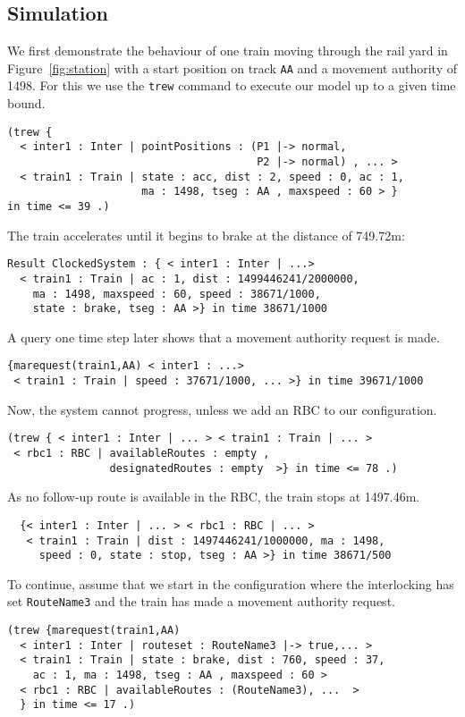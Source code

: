 \subsection{Simulation}
We first demonstrate the behaviour of one train moving through the
rail yard in Figure~\ref{fig:station} with a start position on track
\texttt{AA} and a movement authority of 1498. For this we use the
\texttt{trew} command to execute our model up to a given time bound.
\begin{lstlisting}
(trew { 
  < inter1 : Inter | pointPositions : (P1 |-> normal,
                                       P2 |-> normal) , ... >
  < train1 : Train | state : acc, dist : 2, speed : 0, ac : 1, 
                     ma : 1498, tseg : AA , maxspeed : 60 > }
in time <= 39 .)
\end{lstlisting}
The train accelerates until it begins to brake at
the distance of 749.72m:
\begin{lstlisting}
Result ClockedSystem : { < inter1 : Inter | ...>
  < train1 : Train | ac : 1, dist : 1499446241/2000000,
    ma : 1498, maxspeed : 60, speed : 38671/1000, 
    state : brake, tseg : AA >} in time 38671/1000
\end{lstlisting}
A query one time step later shows that a movement authority request is made.
\begin{lstlisting}
{marequest(train1,AA) < inter1 : ...> 
 < train1 : Train | speed : 37671/1000, ... >} in time 39671/1000
\end{lstlisting}
Now, the system cannot progress, unless we add an RBC to
our configuration. 
\begin{lstlisting}
(trew { < inter1 : Inter | ... > < train1 : Train | ... >
 < rbc1 : RBC | availableRoutes : empty ,
                designatedRoutes : empty  >} in time <= 78 .)
\end{lstlisting}
As no follow-up route is available in the RBC, the train stops at 1497.46m.
\begin{lstlisting}
  {< inter1 : Inter | ... > < rbc1 : RBC | ... >
   < train1 : Train | dist : 1497446241/1000000, ma : 1498,
     speed : 0, state : stop, tseg : AA >} in time 38671/500
\end{lstlisting}
To continue, assume that we start in the configuration where the
interlocking has set \texttt{RouteName3} and the train has made a
movement authority request.
\begin{lstlisting}
(trew {marequest(train1,AA)
  < inter1 : Inter | routeset : RouteName3 |-> true,... >
  < train1 : Train | state : brake, dist : 760, speed : 37,
    ac : 1, ma : 1498, tseg : AA , maxspeed : 60 >
  < rbc1 : RBC | availableRoutes : (RouteName3), ...  >
  } in time <= 17 .)
\end{lstlisting}
